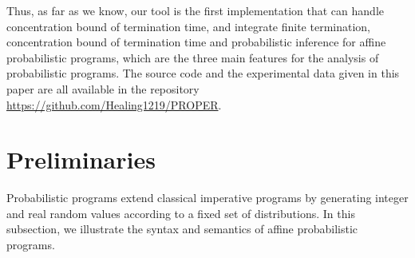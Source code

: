 \documentclass[conference]{IEEEtran}
\begin{document}
Thus, as far as we know, our tool is the first implementation that can handle concentration bound of termination time, and integrate finite termination, concentration bound of termination time and probabilistic inference for affine probabilistic programs, which are the three main features for the analysis of probabilistic programs. The source code and the experimental data given in this paper are all available in the repository 
\url{https://github.com/Healing1219/PROPER}. 

\section{Preliminaries}
Probabilistic programs extend classical imperative programs by generating integer and real random values according to a fixed set of distributions. In this subsection, we illustrate the syntax and semantics of affine probabilistic programs. 
\end{document}
